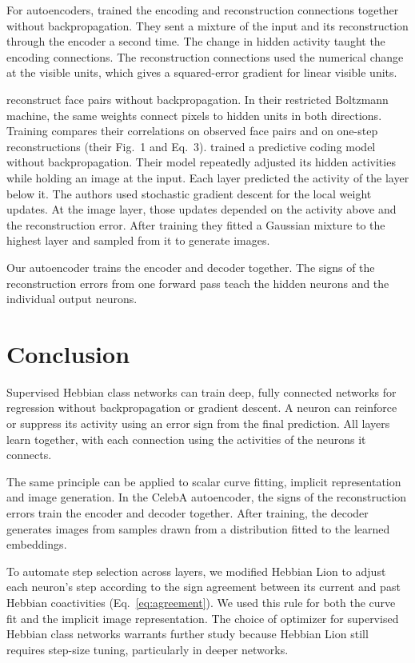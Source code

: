 \documentclass[10pt]{article}
\begin{document}
For autoencoders, \citet{hinton1988recirculation} trained the encoding and reconstruction connections together without backpropagation. They sent a mixture of the input and its reconstruction through the encoder a second time. The change in hidden activity taught the encoding connections. The reconstruction connections used the numerical change at the visible units, which gives a squared-error gradient for linear visible units.

\citet{teh2000} reconstruct face pairs without backpropagation. In their restricted Boltzmann machine, the same weights connect pixels to hidden units in both directions. Training compares their correlations on observed face pairs and on one-step reconstructions (their Fig.~1 and Eq.~3). \citet{ororbia2022} trained a predictive coding model without backpropagation. Their model repeatedly adjusted its hidden activities while holding an image at the input. Each layer predicted the activity of the layer below it. The authors used stochastic gradient descent for the local weight updates. At the image layer, those updates depended on the activity above and the reconstruction error. After training they fitted a Gaussian mixture to the highest layer and sampled from it to generate images.

Our autoencoder trains the encoder and decoder together. The signs of the reconstruction errors from one forward pass teach the hidden neurons and the individual output neurons.

\section{Conclusion}
Supervised Hebbian class networks can train deep, fully connected networks for regression without backpropagation or gradient descent. A neuron can reinforce or suppress its activity using an error sign from the final prediction. All layers learn together, with each connection using the activities of the neurons it connects.

The same principle can be applied to scalar curve fitting, implicit representation and image generation. In the CelebA autoencoder, the signs of the reconstruction errors train the encoder and decoder together. After training, the decoder generates images from samples drawn from a distribution fitted to the learned embeddings.

To automate step selection across layers, we modified Hebbian Lion to adjust each neuron's step according to the sign agreement between its current and past Hebbian coactivities (Eq.~\ref{eq:agreement}). We used this rule for both the curve fit and the implicit image representation. The choice of optimizer for supervised Hebbian class networks warrants further study because Hebbian Lion still requires step-size tuning, particularly in deeper networks.



\end{document}
